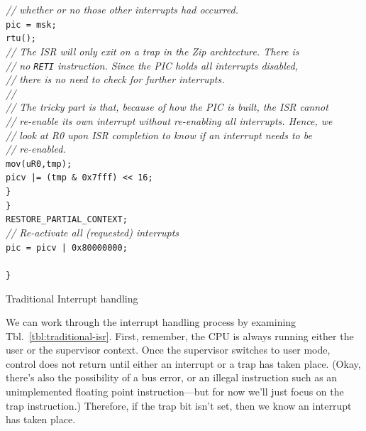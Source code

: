 \documentclass{gqtekspec}
\begin{document}
\begin{table}
\begin{center}
\begin{tabbing}
	\> \>\>\>	{\em // whether or no those other interrupts had occurred.}\\
	\> \>\>\>	{\tt *pic = msk; }\\
	\> \>\>\>	{\tt rtu(); }\\
	\> \>\>\>	{\em // The ISR will only exit on a trap in the Zip archtecture.  There is}\\
	\> \>\>\>	{\em // no {\tt RETI} instruction.  Since the PIC holds all interrupts disabled,}\\
	\> \>\>\>	{\em // there is no need to check for further interrupts.}\\
	\> \>\>\>	{\em // }\\
	\> \>\>\>	{\em // The tricky part is that, because of how the PIC is built, the ISR cannot}\\
	\>\>\>\>	{\em // re-enable its own interrupt without re-enabling all interrupts.  Hence, we}\\
	\>\>\>\>	{\em // look at R0 upon ISR completion to know if an interrupt needs to be }\\
	\> \>\>\>	{\em // re-enabled. }\\
	\> \>\>\>	{\tt mov(uR0,tmp); }\\
	\> \>\>\>	{\tt picv |= (tmp \& 0x7fff) << 16; }\\
	\> \>\>		{\tt \} }\\
	\> \>	{\tt \} }\\
	\> \>	{\tt RESTORE\_PARTIAL\_CONTEXT; }\\
	\> \>	{\em // Re-activate all (requested) interrupts }\\
	\> \>	{\tt *pic = picv | 0x80000000; }\\
	\>{\tt \} }\\
{\tt \}}\\
\end{tabbing}
\caption{Traditional Interrupt handling}\label{tbl:traditional-isr}
\end{center}\end{table}

We can work through the interrupt handling process by examining
Tbl.~\ref{tbl:traditional-isr}.  First, remember, the CPU is always running
either the user or the supervisor context.  Once the supervisor switches to
user mode, control does not return until either an interrupt or a trap
has taken place.  (Okay, there's also the possibility of a bus error, or an
illegal instruction such as an unimplemented floating point instruction---but
for now we'll just focus on the trap instruction.)  Therefore, if the trap bit
isn't set, then we know an interrupt has taken place.
\end{document}

